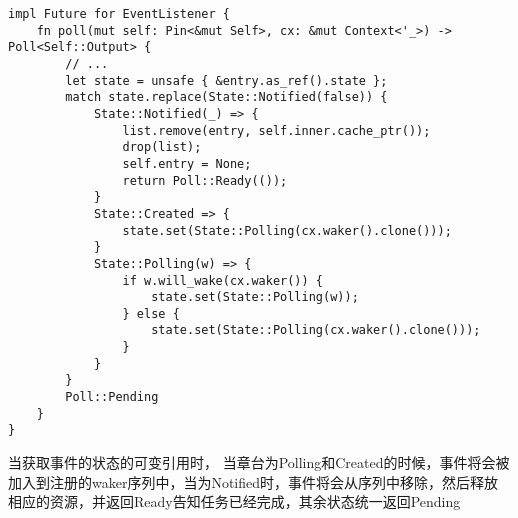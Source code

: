 \begin{lstlisting}[caption=Event的事件Poll机制]
impl Future for EventListener {
    fn poll(mut self: Pin<&mut Self>, cx: &mut Context<'_>) -> Poll<Self::Output> {
        // ...
        let state = unsafe { &entry.as_ref().state };
        match state.replace(State::Notified(false)) {
            State::Notified(_) => {
                list.remove(entry, self.inner.cache_ptr());
                drop(list);
                self.entry = None;
                return Poll::Ready(());
            }
            State::Created => {
                state.set(State::Polling(cx.waker().clone()));
            }
            State::Polling(w) => {
                if w.will_wake(cx.waker()) {
                    state.set(State::Polling(w));
                } else {
                    state.set(State::Polling(cx.waker().clone()));
                }
            }
        }
        Poll::Pending
    }
}
\end{lstlisting}


当获取事件的状态的可变引用时， 当章台为Polling和Created的时候，事件将会被加入到注册的waker序列中，当为Notified时，事件将会从序列中移除，然后释放相应的资源，并返回Ready告知任务已经完成，其余状态统一返回Pending
